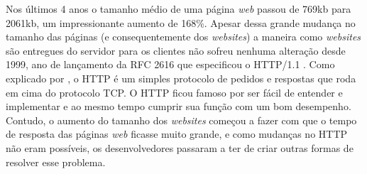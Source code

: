 Nos últimos 4 anos o tamanho médio de uma página \textit{web} passou de 769kb para 2061kb, um impressionante aumento de 168\%. Apesar dessa grande mudança no tamanho das páginas (e consequentemente dos \textit{websites}) a maneira como \textit{websites} são entregues do servidor para os clientes não sofreu nenhuma alteração desde 1999, ano de lançamento da RFC 2616 que especificou o HTTP/1.1 \cite{RFC2616}. Como explicado por \cite{Tanenbaum}, o HTTP é um simples protocolo de pedidos e respostas que roda em cima do protocolo TCP. O HTTP ficou famoso por ser fácil de entender e implementar e ao mesmo tempo cumprir sua função com um bom desempenho. Contudo, o aumento do tamanho dos \textit{websites} começou a fazer com que o tempo de resposta das páginas \textit{web} ficasse muito grande, e como mudanças no HTTP não eram possíveis, os desenvolvedores passaram a ter de criar outras formas de resolver esse problema.